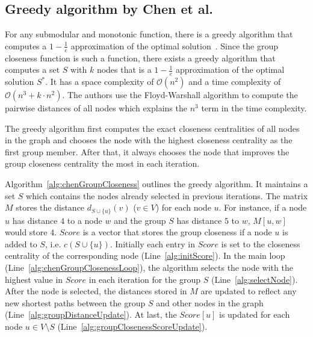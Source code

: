 \subsection{Greedy algorithm by Chen et al.}
For any submodular and monotonic function, there is a greedy algorithm that computes a $1 - \frac{1}{e}$ approximation of the optimal solution~\cite{nemhauser1978analysis}. Since the group closeness function is such a function, there exists a greedy algorithm that computes a set $S$ with $k$ nodes that is a $1 - \frac{1}{e}$ approximation of the optimal solution $S^*$. It has a space complexity of $\mathcal{O}(n^2)$ and a time complexity of $\mathcal{O}(n^3 + k \cdot n^2)$. The authors use the Floyd-Warshall algorithm to compute the pairwise distances of all nodes which explains the $n^3$ term in the time complexity.

The greedy algorithm first computes the exact closeness centralities of all nodes in the graph and chooses the node with the highest closeness centrality as the first group member. After that, it always chooses the node that improves the group closeness centrality the most in each iteration.

Algorithm~\ref{alg:chenGroupCloseness} outlines the greedy algorithm. It maintains a set $S$ which contains the nodes already selected in previous iterations. The matrix $M$ stores the distance $d_{S \cup \{u\}}(v)$ ($v \in V$) for each node $u$. For instance, if a node $u$ has distance $4$ to a node $w$ and the group $S$ has distance $5$ to $w$, $M[u, w]$ would store $4$. $Score$ is a vector that stores the group closeness if a node $u$ is added to $S$, i.e. $c(S \cup \{u\})$. Initially each entry in $Score$ is set to the closeness centrality of the corresponding node (Line~\ref{alg:initScore}). In the main loop (Line~\ref{alg:chenGroupClosenessLoop}), the algorithm selects the node with the highest value in $Score$ in each iteration for the group $S$ (Line~\ref{alg:selectNode}). After the node is selected, the distances stored in $M$ are updated to reflect any new shortest paths between the group $S$ and other nodes in the graph (Line~\ref{alg:groupDistanceUpdate}). At last, the $Score[u]$ is updated for each node $u \in V \setminus S$ (Line~\ref{alg:groupClosenessScoreUpdate}).

